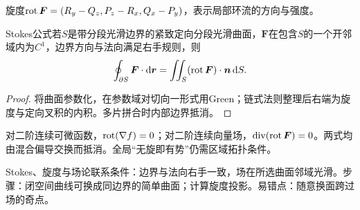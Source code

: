 \begin{definition}{旋度}$\operatorname{rot}\bm F=(R_y-Q_z,P_z-R_x,Q_x-P_y)$，表示局部环流的方向与强度。\end{definition}
\begin{theorem}{Stokes公式}若$S$是带分段光滑边界的紧致定向分段光滑曲面，$\bm F$在包含$S$的一个开邻域内为$C^1$，边界方向与法向满足右手规则，则
\begin{equation}\oint_{\partial S}\bm F\cdot\mathop{}\!\mathrm{d}\bm r=\iint_S(\operatorname{rot}\bm F)\cdot\bm n\mathop{}\!\mathrm{d} S.\end{equation}
\end{theorem}
\begin{proof}将曲面参数化，在参数域对切向一形式用Green；链式法则整理后右端为旋度与定向叉积的内积。多片拼合时内部边界抵消。\end{proof}
\begin{extension}对二阶连续可微函数，$\operatorname{rot}(\nabla f)=0$；对二阶连续向量场，$\operatorname{div}(\operatorname{rot}\bm F)=0$。两式均由混合偏导交换而抵消。全局“无旋即有势”仍需区域拓扑条件。\end{extension}

\begin{method}{Stokes、旋度与场论联系}条件：边界与法向右手一致，场在所选曲面邻域光滑。步骤：闭空间曲线可换成同边界的简单曲面；计算旋度投影。易错点：随意换面跨过场的奇点。\end{method}
